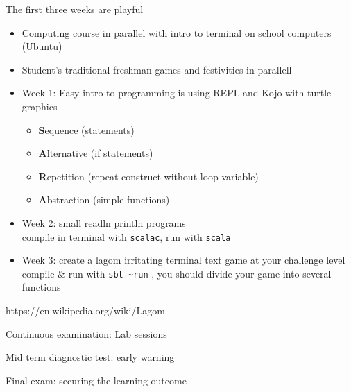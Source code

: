 \documentclass[aspectratio=169]{beamer}
\newcommand{\code}{\lstinline[basicstyle=\ttfamily]}
\newenvironment{Slide}[1]%
  {\begin{frame}[environment=Slide]{#1}}
  {\end{frame}}%
\begin{document}
\begin{Slide}{The first three weeks are playful}
  
  \begin{itemize}
    \item Computing course in parallel with intro to terminal on school computers (Ubuntu)
    \item Student's traditional freshman games and festivities in parallell
    \item Week 1: Easy intro to programming is using REPL and Kojo with turtle graphics%
    \begin{itemize}
      \item \textbf{S}equence (statements)
      \item \textbf{A}lternative (if statements)
      \item \textbf{R}epetition (repeat construct without loop variable)
      \item \textbf{A}bstraction (simple functions)   
    \end{itemize}
    \item Week 2: small readln println programs \\ compile in terminal with \code|scalac|, run with \code|scala|
    \item Week 3: create a lagom irritating terminal text game at your challenge level \\ compile \& run with \code|sbt ~run| , you should divide your game into several functions   
  \end{itemize}
\footnotesize{https://en.wikipedia.org/wiki/Lagom}
\end{Slide}  


  


\begin{Slide}{Continuous examination: Lab sessions}
  
\end{Slide}  

\begin{Slide}{Mid term diagnostic test: early warning}
  
\end{Slide}  


\begin{Slide}{Final exam: securing the learning outcome}
  
\end{Slide}  
\end{document}
